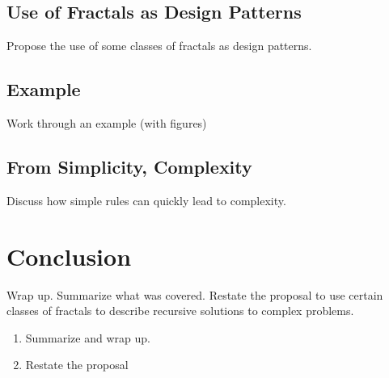 \documentclass[jou,apacite]{apa6}
\begin{document}
\subsection{Use of Fractals as Design Patterns}
Propose the use of some classes of fractals as design patterns.

\subsection{Example}
Work through an example (with figures)

\subsection{From Simplicity, Complexity}
Discuss how simple rules can quickly lead to complexity.

\section{Conclusion}  %
Wrap up.  Summarize what was covered.  Restate the proposal to use certain classes of fractals to describe recursive solutions to complex problems.
\begin{enumerate}
  \item Summarize and wrap up.
  \item Restate the proposal
\end{enumerate}


\end{document}
